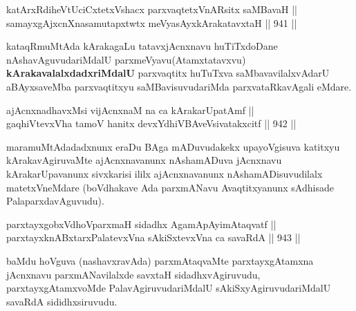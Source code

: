 \begin{shl}
katArxRdiheVtUciCxtetxVshacx parxvaqtetxVnARsitx saMBavaH || \\
samayxgAjxcnXnasamutapxtwtx meVyasAyxkArakatavxtaH \hfill || 941 ||  
\end{shl}

\begin{artha}
kataqRmuMtAda kArakagaLu tatavxjAcnxnavu huTiTxdoDane nAshavAguvudariMdalU parxmeVyavu(Atamxtatavxvu) \textbf{kArakavalalxdadxriMdalU} parxvaqtitx huTuTxva saMbavavilalxvAdarU aBAyxsaveMba parxvaqtitxyu saMBavisuvudariMda parxvataRkavAgali eMdare.
\end{artha}

\begin{shl}
ajAcnxnadhavxMsi vijAcnxnaM na ca kArakarUpatAmf || \\
gaqhiVtevxVha tamoV hanitx devxYdhiVBAveV\s sivatakxcitf \hfill || 942 ||  
\end{shl}

\begin{artha}
maramuMtAdadadxnunx eraDu BAga mADuvudakekx upayoVgisuva katitxyu kArakavAgiruvaMte ajAcnxnavanunx nAshamADuva jAcnxnavu kArakarUpavanunx sivxkarisi ililx ajAcnxnavanunx nAshamADisuvudilalx matetxVneMdare (boVdhakave Ada parxmANavu Avaqtitxyanunx sAdhisade PalaparxdavAguvudu).
\end{artha}

\begin{shl}
\footnotemark[1]parxtayxgobxVdhoV\s parxmaH sidadhx AgamApAyimAtaqvatf || \\
parxtayxknABxtarxPalatevxVna sAkiSxtevxVna ca savaRdA \hfill || 943 ||  
\end{shl}

\begin{artha}
baMdu hoVguva (nashavxravAda) parxmAtaqvaMte parxtayxgAtamxna jAcnxnavu parxmANavilalxde savxtaH sidadhxvAgiruvudu, parxtayxgAtamxvoMde PalavAgiruvudariMdalU sAkiSxyAgiruvudariMdalU savaRdA sididhxsiruvudu.
\end{artha}


